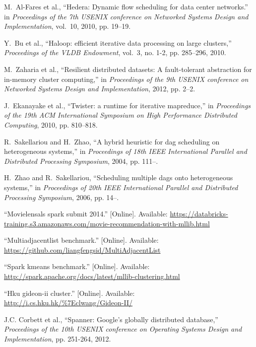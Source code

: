 \documentclass[10pt,journal,compsoc]{IEEEtran}
\begin{document}
\begin{thebibliography}{43}
M.~Al-Fares et al., ``Hedera:
  Dynamic flow scheduling for data center networks.'' in \emph{Proceedings of
  the 7th USENIX conference on Networked Systems Design and Implementation},
  vol.~10, 2010, pp. 19--19.

Y.~Bu et al., ``Haloop: efficient iterative
  data processing on large clusters,'' \emph{Proceedings of the VLDB
  Endowment}, vol.~3, no. 1-2, pp. 285--296, 2010.

M.~Zaharia et al., ``Resilient distributed datasets: A fault-tolerant
  abstraction for in-memory cluster computing,'' in \emph{Proceedings of the
  9th USENIX conference on Networked Systems Design and Implementation}, 2012,
  pp. 2--2.

J.~Ekanayake et al.,
  ``Twister: a runtime for iterative mapreduce,'' in \emph{Proceedings of the
  19th ACM International Symposium on High Performance Distributed Computing},
  2010, pp. 810--818.

R.~Sakellariou and H.~Zhao, ``A hybrid heuristic for dag scheduling on
  heterogeneous systems,'' in \emph{Proceedings of 18th IEEE International
  Parallel and Distributed Processing Symposium}, 2004, pp. 111--.

H.~Zhao and R.~Sakellariou, ``Scheduling multiple dags onto heterogeneous
  systems,'' in \emph{Proceedings of 20th IEEE International Parallel and
  Distributed Processing Symposium}, 2006, pp. 14--.

\BIBentryALTinterwordspacing
``Movielensals spark submit 2014.'' [Online]. Available:
  \url{https://databricks-training.s3.amazonaws.com/movie-recommendation-with-mllib.html}
\BIBentrySTDinterwordspacing

\BIBentryALTinterwordspacing
``Multiadjacentlist benchmark.'' [Online]. Available:
  \url{https://github.com/liangfengsid/MultiAdjacentList}
\BIBentrySTDinterwordspacing

\BIBentryALTinterwordspacing
``Spark kmeans benchmark.'' [Online]. Available:
  \url{http://spark.apache.org/docs/latest/mllib-clustering.html}
\BIBentrySTDinterwordspacing


\BIBentryALTinterwordspacing
``Hku gideon-ii cluster.'' [Online]. Available:
  \url{http://i.cs.hku.hk/\%7Eclwang/Gideon-II/}
\BIBentrySTDinterwordspacing


J.C. Corbett et al., ``Spanner: Google’s globally distributed database,'' 
\emph{Proceedings of the 10th USENIX conference on Operating Systems Design and Implementation}, pp. 251-264, 2012.


\end{thebibliography}
\end{document}
